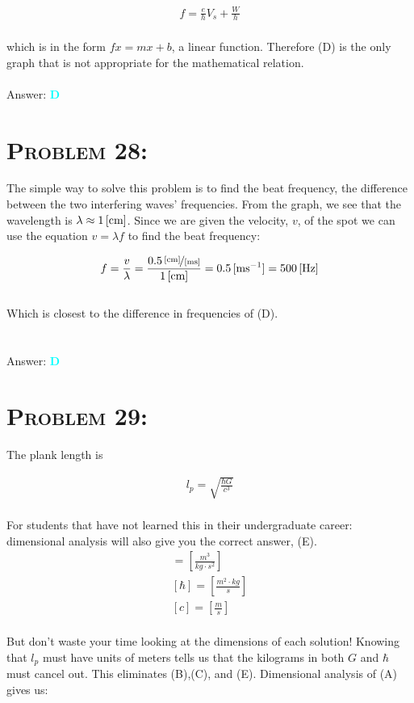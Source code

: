 \documentclass{article}
\begin{document}
\begin{gather}
f = \frac{e}{h} V_{s} + \frac{W}{h} \nonumber
\end{gather}
\\
which is in the form $f{x} = mx + b$, a linear function. Therefore (D) is the only graph that is not appropriate for the mathematical relation.
\\\\
Answer: \textbf{\textcolor{cyan}D}\\


\section{\textsc{Problem 28:}} The simple way to solve this problem is to find the beat frequency, the difference between the two interfering waves' frequencies. From the graph, we see that the wavelength is $\lambda \approx \unit[1]{[cm]}$. Since we are given the velocity, $v$, of the spot we can use the equation $v = \lambda f$ to find the beat frequency:

\begin{gather}
f = \frac{v}{\lambda} = \frac{\unitfrac[0.5]{[cm]}{[ms]}}{\unit[1]{[cm]}} = \unit[0.5]{[ms^{-1}]} = \unit[500]{[Hz]} \nonumber
\end{gather}
\\
Which is closest to the difference in frequencies of (D). \\
\\\\
Answer: \textbf{\textcolor{cyan}D}\\


\section{\textsc{Problem 29:}} The plank length is 

\begin{gather}
l_{p} = \sqrt{\frac{\hbar G}{c^{3}}}
\end{gather}
\\
For students that have not learned this in their undergraduate career: dimensional analysis will also give you the correct answer, (E). \\

\begin{gather}
[G] = \left[   \frac{m^{3}}{kg \cdot s^{2}}   \right]\\
[\hbar] = \left[   \frac{m^{2} \cdot kg}{s}   \right]\\
[c] = \left[  \frac{m}{s} \right]
\end{gather}
\\
But don't waste your time looking at the dimensions of each solution! Knowing that $l_{p}$ must have units of meters tells us that the kilograms in both $G$ and $\hbar$ must cancel out. This eliminates (B),(C), and (E). Dimensional analysis of (A) gives us:
\end{document}
